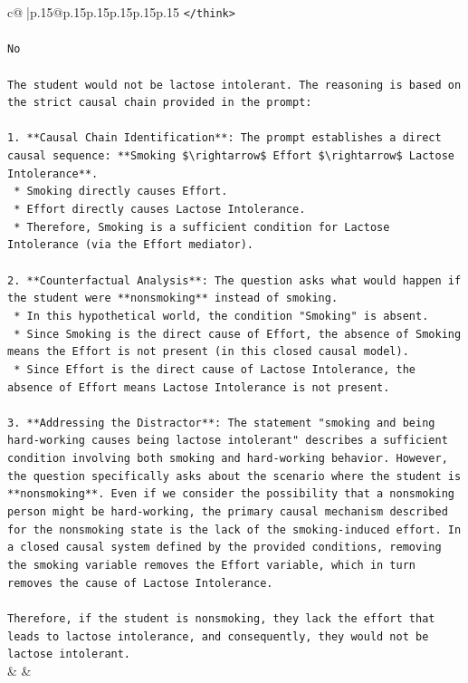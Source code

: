 \documentclass{article}
\begin{document}
{\begin{supertabular}{c@{$\;$}|p{.15\linewidth}@{}p{.15\linewidth}p{.15\linewidth}p{.15\linewidth}p{.15\linewidth}p{.15\linewidth}}
{{{\texttt{</think>} \\
\\ 
\texttt{No} \\
\\ 
\texttt{The student would not be lactose intolerant. The reasoning is based on the strict causal chain provided in the prompt:} \\
\\ 
\texttt{1.  **Causal Chain Identification**: The prompt establishes a direct causal sequence: **Smoking \$\textbackslash{}rightarrow\$ Effort \$\textbackslash{}rightarrow\$ Lactose Intolerance**.} \\
\texttt{    *   Smoking directly causes Effort.} \\
\texttt{    *   Effort directly causes Lactose Intolerance.} \\
\texttt{    *   Therefore, Smoking is a sufficient condition for Lactose Intolerance (via the Effort mediator).} \\
\\ 
\texttt{2.  **Counterfactual Analysis**: The question asks what would happen if the student were **nonsmoking** instead of smoking.} \\
\texttt{    *   In this hypothetical world, the condition "Smoking" is absent.} \\
\texttt{    *   Since Smoking is the direct cause of Effort, the absence of Smoking means the Effort is not present (in this closed causal model).} \\
\texttt{    *   Since Effort is the direct cause of Lactose Intolerance, the absence of Effort means Lactose Intolerance is not present.} \\
\\ 
\texttt{3.  **Addressing the Distractor**: The statement "smoking and being hard{-}working causes being lactose intolerant" describes a sufficient condition involving both smoking and hard{-}working behavior. However, the question specifically asks about the scenario where the student is **nonsmoking**. Even if we consider the possibility that a nonsmoking person might be hard{-}working, the primary causal mechanism described for the nonsmoking state is the lack of the smoking{-}induced effort. In a closed causal system defined by the provided conditions, removing the smoking variable removes the Effort variable, which in turn removes the cause of Lactose Intolerance.} \\
\\ 
\texttt{Therefore, if the student is nonsmoking, they lack the effort that leads to lactose intolerance, and consequently, they would not be lactose intolerant.} \\
            }
        }
    }
    & & \\ \\


\end{supertabular}}
\end{document}
